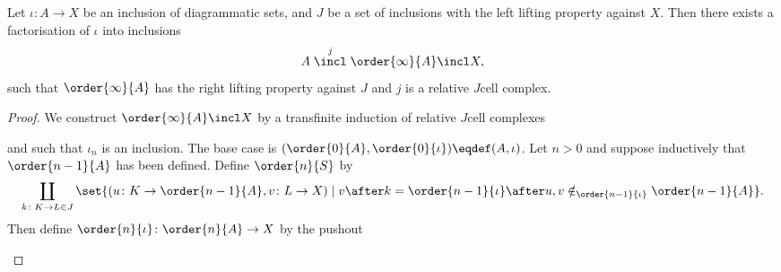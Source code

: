 \begin{lem} \label{lrm:relative_small_object_argument}
    Let \( \iota \colon A \to X \) be an inclusion of diagrammatic sets, and \( J \) be a set of inclusions with the left lifting property against \( X \).
    Then there exists a factorisation of \( \iota \) into inclusions
    \begin{equation*}
        A \stackrel{j}{\incl} \order{\infty}{A} \incl X,
    \end{equation*}
    such that \( \order{\infty}{A} \) has the right lifting property against \( J \) and \( j \) is a relative \( J \)\nbd cell complex.
\end{lem}
\begin{proof}
    We construct \( \order{\infty}{A} \incl X \) by a transfinite induction of relative \( J \)\nbd cell complexes
    \begin{center}
    \end{center}
    and such that \( \iota_n \) is an inclusion.
    The base case is \( (\order{0}{A}, \order{0}{\iota}) \eqdef (A, \iota) \).
    Let \( n > 0 \) and suppose inductively that \( \order{n - 1}{A} \) has been defined.
    Define \( \order{n}{S} \) by
    \begin{equation*}
        \coprod_{k \colon K \to L \in J} \set{(u \colon K \to \order{n - 1}{A}, v \colon L \to X) \mid v \after k = \order{n - 1}{\iota} \after u, v \notin_{\order{n - 1}{\iota}} \order{n - 1}{A} }.
    \end{equation*}
    Then define \( \order{n}{\iota} \colon \order{n}{A} \to X \) by the pushout
    \begin{center}
        \begin{tikzcd}

\end{tikzcd}
\end{center}
\end{proof}
